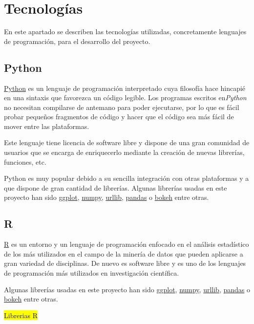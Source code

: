 \section{Tecnologías}\label{tecnologias}
 En este apartado se describen las tecnologías utilizadas, concretamente lenguajes de programación, para el desarrollo del proyecto. 
 
 \subsection{Python}\label{tecnologias_python}
 
 \href{python.org}{Python} es un lenguaje de programación interpretado cuya filosofía hace hincapié en una sintaxis que favorezca un código legible. Los programas escritos en\textit{Python} no necesitan compilarse de antemano para poder ejecutarse, por lo que es fácil probar pequeños fragmentos de código y hacer que el código sea más fácil de mover entre las plataformas.
 
 
Este lenguaje tiene licencia de software libre y dispone de una gran comunidad de usuarios que se encarga de enriquecerlo mediante la creación de nuevas librerías, funciones, etc. 

Python es muy popular debido a su sencilla integración con otras plataformas y a que dispone de gran cantidad de librerías. Algunas librerías usadas en este proyecto han sido \href{https://ggplot2.tidyverse.org/}{ggplot}, \href{https://numpy.org/}{numpy}, \href{https://numpy.org/}{urllib}, \href{https://pandas.pydata.org/}{pandas} o \href{https://bokeh.org/}{bokeh} entre otras.

  \subsection{R}\label{tecnologias_R}
  \href{r-project.org}{R} es un entorno y un lenguaje de programación enfocado en el análisis estadístico de los más utilizados en el campo de la minería de datos que pueden aplicarse a gran variedad de disciplinas. De nuevo es software libre y es uno de los lenguajes de programación más utilizados en investigación científica.
  
  Algunas librerías usadas en este proyecto han sido \href{https://ggplot2.tidyverse.org/}{ggplot}, \href{https://numpy.org/}{numpy}, \href{https://numpy.org/}{urllib}, \href{https://pandas.pydata.org/}{pandas} o \href{https://bokeh.org/}{bokeh} entre otras.
  
   \hl{Librerias R}

